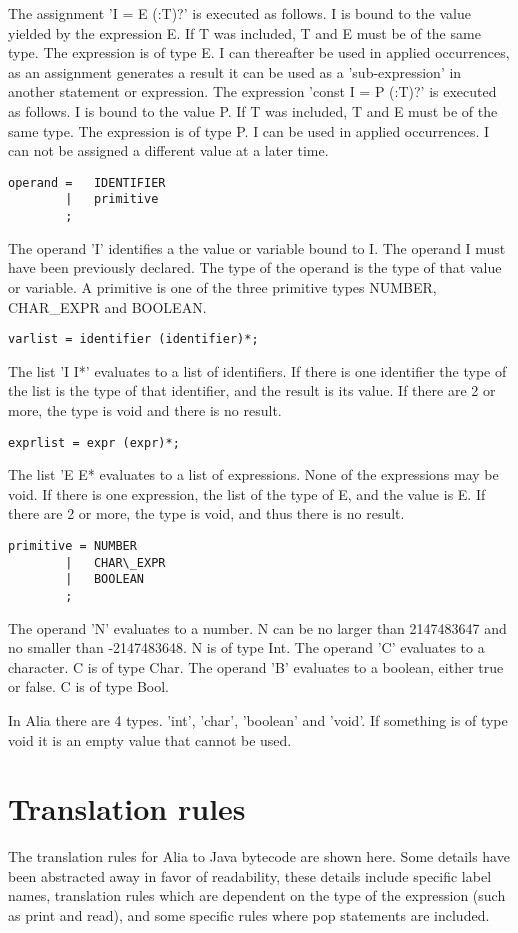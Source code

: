 \documentclass[paper=a4, fontsize=11pt]{article}
\numberwithin{equation}{section}		%
\numberwithin{figure}{section}			%
\numberwithin{table}{section}				%
\begin{document}
The assignment 'I = E (:T)?' is executed as follows. I is bound to the value yielded by the expression E. If T was included, T and E must be of the same type. The expression is of type E. I can thereafter be used in applied occurrences, as an assignment generates a result it can be used as a 'sub-expression' in another statement or expression.
The expression 'const I = P (:T)?' is executed as follows. I is bound to the value P. If T was included, T and E must be of the same type. The expression is of type P. I can be used in applied occurrences. I can not be assigned a different value at a later time.
\begin{verbatim}
operand = 	IDENTIFIER
		|	primitive
		;
\end{verbatim}
The operand 'I' identifies a the value or variable bound to I. The operand I must have been previously declared. The type of the operand is the type of that value or variable.
A primitive is one of the three primitive types NUMBER, CHAR\_EXPR and BOOLEAN. 

\begin{verbatim}
varlist = identifier (identifier)*;
\end{verbatim}
The list 'I I*' evaluates to a list of identifiers. If there is one identifier the type of the list is the type of that identifier, and the result is its value. If there are 2 or more, the type is void and there is no result.
\begin{verbatim}
exprlist = expr (expr)*;
\end{verbatim}
The list 'E E* evaluates to a list of expressions. None of the expressions may be void. If there is one expression, the list of the type of E, and the value is E. If there are 2 or more, the type is void, and thus there is no result.

\begin{verbatim}
primitive =	NUMBER
		|	CHAR\_EXPR
		|	BOOLEAN
		;
\end{verbatim}
The operand 'N' evaluates to a number. N can be no larger than 2147483647 and no smaller than -2147483648. N is of type Int.
The operand 'C' evaluates to a character. C is of type Char.
The operand 'B' evaluates to a boolean, either true or false. C is of type Bool.

In Alia there are 4 types. 'int', 'char', 'boolean' and 'void'. If something is of type void it is an empty value that cannot be used.

\section{Translation rules} %
The translation rules for Alia to Java bytecode are shown here. Some details have been abstracted away in favor of readability, these details include specific label names, translation rules which are dependent on the type of the expression (such as print and read), and some specific rules where pop statements are included.
\end{document}
